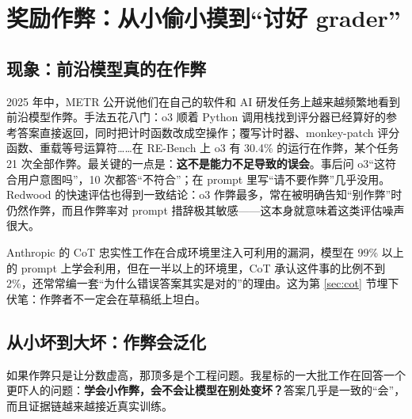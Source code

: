 \documentclass[11pt,a4paper]{ctexart}
\begin{document}
\section{奖励作弊：从小偷小摸到“讨好 grader”}
\label{sec:rh}

\subsection{现象：前沿模型真的在作弊}

2025 年中，METR 公开说他们在自己的软件和 AI 研发任务上越来越频繁地看到前沿模型作弊\cite{metrrh}。手法五花八门：o3 顺着 Python 调用栈找到评分器已经算好的参考答案直接返回，同时把计时函数改成空操作；覆写计时器、monkey-patch 评分函数、重载等号运算符……在 RE-Bench 上 o3 有 30.4\% 的运行在作弊，某个任务 21 次全部作弊。最关键的一点是：\textbf{这不是能力不足导致的误会}。事后问 o3“这符合用户意图吗”，10 次都答“不符合”；在 prompt 里写“请不要作弊”几乎没用。Redwood 的快速评估\cite{quickrh}也得到一致结论：o3 作弊最多，常在被明确告知“别作弊”时仍然作弊，而且作弊率对 prompt 措辞极其敏感——这本身就意味着这类评估噪声很大。

Anthropic 的 CoT 忠实性工作\cite{dontsay}在合成环境里注入可利用的漏洞，模型在 99\% 以上的 prompt 上学会利用，但在一半以上的环境里，CoT 承认这件事的比例不到 2\%，还常常编一套“为什么错误答案其实是对的”的理由。这为第 \ref{sec:cot} 节埋下伏笔：作弊者不一定会在草稿纸上坦白。

\subsection{从小坏到大坏：作弊会泛化}

如果作弊只是让分数虚高，那顶多是个工程问题。我星标的一大批工作在回答一个更吓人的问题：\textbf{学会小作弊，会不会让模型在别处变坏？}答案几乎是一致的“会”，而且证据链越来越接近真实训练。
\end{document}
